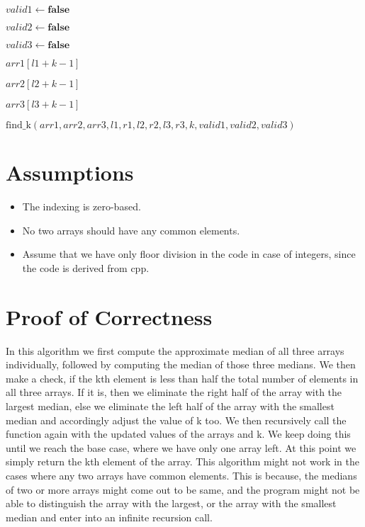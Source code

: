 \documentclass{article}
\begin{document}
\begin{algorithm}
\begin{algorithmic}[1]
            \State $valid1 \gets \textbf{false}$
        \EndIf

            \State $valid2 \gets \textbf{false}$
        \EndIf

            \State $valid3 \gets \textbf{false}$
        \EndIf

            \State \Return $arr1[l1 + k - 1]$
        \EndIf

            \State \Return $arr2[l2 + k - 1]$
        \EndIf

            \State \Return $arr3[l3 + k - 1]$
        \EndIf

        \State \Return $\text{find\_k}(arr1, arr2, arr3, l1, r1, l2, r2, l3, r3, k, valid1, valid2, valid3)$
    \EndFunction
\end{algorithmic}
\end{algorithm}

\newpage

\section{Assumptions}

\begin{itemize}
  \item The indexing is zero-based.
  \item No two arrays should have any common elements.
  \item Assume that we have only floor division in the code in case of integers, since the code is derived from cpp.
\end{itemize}

\section{Proof of Correctness}

In this algorithm we first compute the approximate median of all three arrays individually, followed by computing the median of those three medians. We then make a check, if the kth element is less than half the total number of elements in all three arrays. If it is, then we eliminate the right half of the array with the largest median, else we eliminate the left half of the array with the smallest median and accordingly adjust the value of k too. We then recursively call the function again with the updated values of the arrays and k. We keep doing this until we reach the base case, where we have only one array left. At this point we simply return the kth element of the array. \newline \newline This algorithm might not work in the cases where any two arrays have common elements. This is because, the medians of two or more arrays might come out to be same, and the program might not be able to distinguish the array with the largest, or the array with the smallest median and enter into an infinite recursion call.
\end{document}
